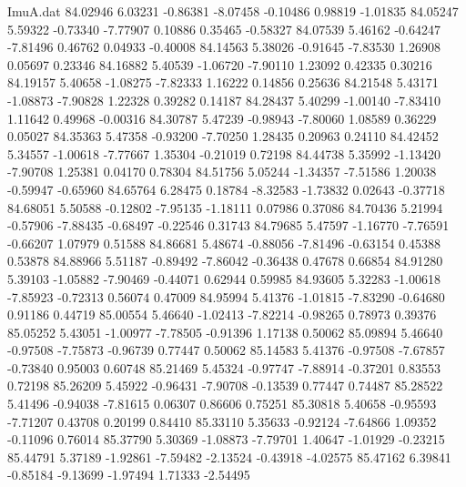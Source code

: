 \begin{filecontents}{ImuA.dat}
  84.02946    6.03231   -0.86381   -8.07458   -0.10486    0.98819   -1.01835
  84.05247    5.59322   -0.73340   -7.77907    0.10886    0.35465   -0.58327
  84.07539    5.46162   -0.64247   -7.81496    0.46762    0.04933   -0.40008
  84.14563    5.38026   -0.91645   -7.83530    1.26908    0.05697    0.23346
  84.16882    5.40539   -1.06720   -7.90110    1.23092    0.42335    0.30216
  84.19157    5.40658   -1.08275   -7.82333    1.16222    0.14856    0.25636
  84.21548    5.43171   -1.08873   -7.90828    1.22328    0.39282    0.14187
  84.28437    5.40299   -1.00140   -7.83410    1.11642    0.49968   -0.00316
  84.30787    5.47239   -0.98943   -7.80060    1.08589    0.36229    0.05027
  84.35363    5.47358   -0.93200   -7.70250    1.28435    0.20963    0.24110
  84.42452    5.34557   -1.00618   -7.77667    1.35304   -0.21019    0.72198
  84.44738    5.35992   -1.13420   -7.90708    1.25381    0.04170    0.78304
  84.51756    5.05244   -1.34357   -7.51586    1.20038   -0.59947   -0.65960
  84.65764    6.28475    0.18784   -8.32583   -1.73832    0.02643   -0.37718
  84.68051    5.50588   -0.12802   -7.95135   -1.18111    0.07986    0.37086
  84.70436    5.21994   -0.57906   -7.88435   -0.68497   -0.22546    0.31743
  84.79685    5.47597   -1.16770   -7.76591   -0.66207    1.07979    0.51588
  84.86681    5.48674   -0.88056   -7.81496   -0.63154    0.45388    0.53878
  84.88966    5.51187   -0.89492   -7.86042   -0.36438    0.47678    0.66854
  84.91280    5.39103   -1.05882   -7.90469   -0.44071    0.62944    0.59985
  84.93605    5.32283   -1.00618   -7.85923   -0.72313    0.56074    0.47009
  84.95994    5.41376   -1.01815   -7.83290   -0.64680    0.91186    0.44719
  85.00554    5.46640   -1.02413   -7.82214   -0.98265    0.78973    0.39376
  85.05252    5.43051   -1.00977   -7.78505   -0.91396    1.17138    0.50062
  85.09894    5.46640   -0.97508   -7.75873   -0.96739    0.77447    0.50062
  85.14583    5.41376   -0.97508   -7.67857   -0.73840    0.95003    0.60748
  85.21469    5.45324   -0.97747   -7.88914   -0.37201    0.83553    0.72198
  85.26209    5.45922   -0.96431   -7.90708   -0.13539    0.77447    0.74487
  85.28522    5.41496   -0.94038   -7.81615    0.06307    0.86606    0.75251
  85.30818    5.40658   -0.95593   -7.71207    0.43708    0.20199    0.84410
  85.33110    5.35633   -0.92124   -7.64866    1.09352   -0.11096    0.76014
  85.37790    5.30369   -1.08873   -7.79701    1.40647   -1.01929   -0.23215
  85.44791    5.37189   -1.92861   -7.59482   -2.13524   -0.43918   -4.02575
  85.47162    6.39841   -0.85184   -9.13699   -1.97494    1.71333   -2.54495

\end{filecontents}
